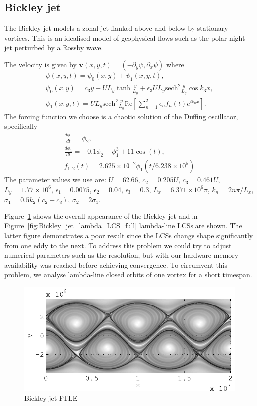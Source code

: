 \documentclass{article}
\begin{document}
\clearpage

\subsection{Bickley jet}

The Bickley jet models a zonal jet flanked above and below by
stationary vortices. This is an idealised model of geophysical flows
such as the polar night jet perturbed by a Rossby
wave\parencite{haller12:_geodes_theor_trans_barrier_two_dimen_flows,beron-vera10:_invar_lagran}.

The velocity is given by $\boldsymbol{v}(x,y,t) = (-\partial_y \psi, \partial_x \psi)$ where
\begin{gather*}
\psi(x,y,t) = \psi_0(x,y) + \psi_1(x,y,t),\\
\psi_0(x,y) = c_3 y - U L_y \tanh\frac{y}{L_y} + \epsilon_3 U L_y \mathrm{sech}^2\frac{y}{L_y} \cos k_3 x,\\
\psi_1(x,y,t) = U L_y \mathrm{sech}^2\frac{y}{L_y} \mathrm{Re}\left[ \sum_{n=1}^2 \epsilon_n f_n(t) e^{i k_n x}\right].
\end{gather*}
The forcing function we choose is a chaotic solution of the Duffing oscillator, specifically
\begin{gather*}
\frac{d \phi_1}{dt} = \phi_2,\\
\frac{d \phi_1}{dt} = -0.1 \phi_2 - \phi_1^3 + 11 \cos(t),\\
f_{1,2}(t) = 2.625 \times 10^{-2} \phi_1(t/6.238 \times 10^5)
\end{gather*}
The parameter values we use are: $U = 62.66$, $c_2 = 0.205 U$, $c_3 = 0.461 U$, $L_y = 1.77 \times 10^6$, $\epsilon_1 = 0.0075$, $\epsilon_2 = 0.04$, $\epsilon_3 = 0.3$, $L_x = 6.371 \times 10^6 \pi$, $k_n = 2 n \pi/L_x$, $\sigma_1 = 0.5 k_2 (c_2 - c_3)$, $\sigma_2 = 2 \sigma_1$.

Figure~\ref{fig:Bickley_jet_FTLE} shows the overall appearance of the Bickley jet and in Figure~\ref{fig:Bickley_jet_lambda_LCS_full} lambda-line LCSs are shown. The latter figure demonstrates a poor result since the LCSs change shape significantly from one eddy to the next. To address this problem we could try to adjust numerical parameters such as the resolution, but with our hardware memory availability was reached before achieving convergence. To circumvent this problem, we analyse lambda-line closed orbits of one vortex for a short timespan.

\begin{figure}
  \centering
  \includegraphics[width=.85\textwidth]{graphics/bickley_jet/ftle_overview}
  \caption{Bickley jet FTLE}
  \label{fig:Bickley_jet_FTLE}
\end{figure}
\end{document}

